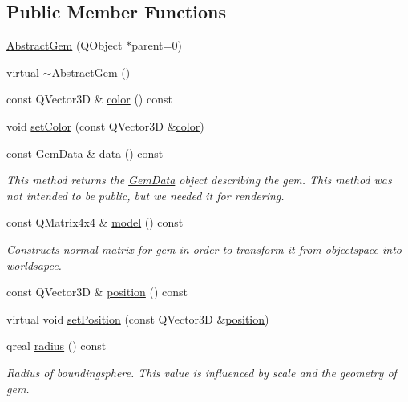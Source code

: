 \subsection*{Public Member Functions}
\begin{DoxyCompactItemize}
\item 
\hyperlink{class_abstract_gem_a489d032060a42a9a8475309105fc585d}{Abstract\+Gem} (Q\+Object $\ast$parent=0)
\item 
virtual \hyperlink{class_abstract_gem_aafe5a4fa8c354ee562602d7b9ff1656b}{$\sim$\+Abstract\+Gem} ()
\item 
const Q\+Vector3\+D \& \hyperlink{class_abstract_gem_abb92885bcf86f43f069c9a0ef203d770}{color} () const 
\item 
void \hyperlink{class_abstract_gem_ace63416f61034b73969b5a89e3913e6d}{set\+Color} (const Q\+Vector3\+D \&\hyperlink{class_abstract_gem_ae73e6ac2448549460fbc597354ab0854}{color})
\item 
const \hyperlink{class_gem_data}{Gem\+Data} \& \hyperlink{class_abstract_gem_ac23fb212f3cca79b345f82e19f8c12d5}{data} () const 
\begin{DoxyCompactList}\small\item\em This method returns the \hyperlink{class_gem_data}{Gem\+Data} object describing the gem.  This method was not intended to be public, but we needed it for rendering. \end{DoxyCompactList}\item 
const Q\+Matrix4x4 \& \hyperlink{class_abstract_gem_a89f90d07bc8a780f053b3c6a5720aeed}{model} () const 
\begin{DoxyCompactList}\small\item\em Constructs normal matrix for gem in order to transform it from objectspace into worldsapce. \end{DoxyCompactList}\item 
const Q\+Vector3\+D \& \hyperlink{class_abstract_gem_a404114854610011363f6d7800985b718}{position} () const 
\item 
virtual void \hyperlink{class_abstract_gem_aaf11fa4b522dc334ebed4f2d031a3e2b}{set\+Position} (const Q\+Vector3\+D \&\hyperlink{class_abstract_gem_accd665898ada9bc95c886bfbcf56d9a8}{position})
\item 
qreal \hyperlink{class_abstract_gem_a628481ed4ebff7b282524a003d4392c2}{radius} () const 
\begin{DoxyCompactList}\small\item\em Radius of boundingsphere. This value is influenced by scale and the geometry of gem. \end{DoxyCompactList}\item 

\end{DoxyCompactItemize}
